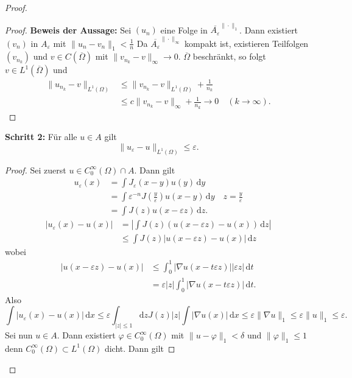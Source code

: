 \documentclass[
paper=a4,
bibtotocnumbered,
liststotocnumbered,
tablecaptionabove,
pointlessnumbers,
twoside,
openright,
10pt
]
{report}
\let\phi\varphi
\theoremstyle{definition}
\numberwithin{equation}{chapter}
\begin{document}
\begin{proof}
\begin{proof}
\textbf{Beweis der Aussage:} Sei $(u_n)$ eine Folge in $\overline{A_\varepsilon}^{\|\cdot \|_1}$. Dann existiert $(v_n)$ in $A_\varepsilon$ mit $\| u_n - v_n\|_1 < \frac{1}{n}$ Da $\overline{A_\varepsilon}^{\|\cdot \|_\infty}$ kompakt ist, existieren Teilfolgen $(v_{n_k})$ und $v\in C(\overline{\Omega})$ mit $\| v_{n_k} -v\|_\infty \to 0$. $\overline \Omega$ beschränkt, so folgt $v\in L^1(\overline{\Omega})$ und
\begin{align*}
 \|u_{n_k}-v\|_{L^1(\Omega)} &\le \| v_{n_k}-v\|_{L^1(\Omega)} + \frac{1}{n_k}\\
 &\le c\| v_{n_k}-v\|_\infty + \frac{1}{n_k} \to 0 \quad (k\to \infty).
\end{align*}
\end{proof}
\textbf{Schritt 2:} Für alle $u\in A$ gilt
\begin{equation}
 \|u_\varepsilon -u\|_{L^1(\Omega)} \le \varepsilon.
\end{equation}
\begin{proof}
Sei zuerst $u\in C_0^\infty(\Omega) \cap A$. Dann gilt
\begin{align*}
 u_\varepsilon(x) &= \int J_\varepsilon(x-y) u(y) \, \mathrm dy \\
 &= \int \varepsilon^{-n} J(\frac{y}{\varepsilon}) u(x-y)\, \mathrm dy \quad z=\frac{y}{\varepsilon}\\
 &= \int J(z) u(x-\varepsilon z) \, \mathrm dz.
\end{align*}
\begin{align*}
 |u_\varepsilon(x) -u(x)| &= | \int J(z) ( u(x-\varepsilon z) - u(x)) \, \mathrm dz| \\
 &\le \int J(z) |u(x- \varepsilon z) - u(x)|\, \mathrm dz
\end{align*}
wobei
\begin{align*}
 |u(x-\varepsilon z) - u(x) | &\le \int_0^1 |\nabla u(x-t\varepsilon z) | |\varepsilon z|\, \mathrm dt\\
 &= \varepsilon |z| \int_0^1 |\nabla u(x-t\varepsilon z) |\, \mathrm dt.
\end{align*}
Also
\begin{equation}
 \int | u_\varepsilon(x) - u(x)|\, \mathrm dx\le \varepsilon \int_{|z|\le 1} \mathrm dz J(z) |z| \int |\nabla u(x)|\, \mathrm dx \le \varepsilon \| \nabla u\|_1\le \varepsilon \| u\|_1\le \varepsilon.
\end{equation}
Sei nun $u\in A$. Dann existiert $\phi \in C_0^\infty(\Omega)$ mit $\|u-\phi\|_1 <\delta$ und $\| \phi\|_1 \le 1$ denn $C_0^\infty(\Omega) \subset L^1(\Omega)$ dicht. Dann gilt

\end{proof}
\end{proof}
\end{document}
